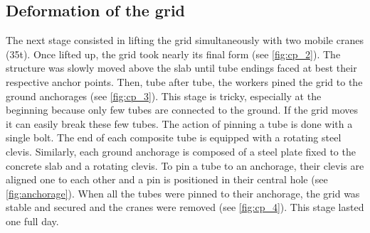 \subsection{Deformation of the grid}
The next stage consisted in lifting the grid simultaneously with two mobile cranes (35t). Once lifted up, the grid took nearly its final form (see \cref{fig:cp_2}). The structure was slowly moved above the slab until tube endings faced at best their respective anchor points. Then, tube after tube, the workers pined the grid to the ground anchorages (see \cref{fig:cp_3}). This stage is tricky, especially at the beginning because only few tubes are connected to the ground. If the grid moves it can easily break these few tubes. The action of pinning a tube is done with a single bolt. The end of each composite tube is equipped with a rotating steel clevis. Similarly, each ground anchorage is composed of a steel plate fixed to the concrete slab and a rotating clevis. To pin a tube to an anchorage, their clevis are aligned one to each other and a pin is positioned in their central hole (see \cref{fig:anchorage}). When all the tubes were pinned to their anchorage, the grid was stable and secured and the cranes were removed (see \cref{fig:cp_4}). This stage lasted one full day.

\setlength{\tmpheight}{(\textheight-2\PhotoBigSkip)/3}
%

